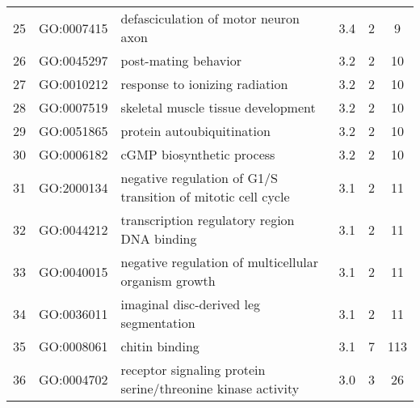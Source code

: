 \begin{tabular}{c|c|p{3in}|c|c|c}
25	&GO:0007415	&defasciculation of motor neuron axon	&3.4	&2	&9\\
26	&GO:0045297	&post-mating behavior	&3.2	&2	&10\\
27	&GO:0010212	&response to ionizing radiation	&3.2	&2	&10\\
28	&GO:0007519	&skeletal muscle tissue development	&3.2	&2	&10\\
29	&GO:0051865	&protein autoubiquitination	&3.2	&2	&10\\
30	&GO:0006182	&cGMP biosynthetic process	&3.2	&2	&10\\
31	&GO:2000134	&negative regulation of G1/S transition of mitotic cell cycle	&3.1	&2	&11\\
32	&GO:0044212	&transcription regulatory region DNA binding	&3.1	&2	&11\\
33	&GO:0040015	&negative regulation of multicellular organism growth	&3.1	&2	&11\\
34	&GO:0036011	&imaginal disc-derived leg segmentation	&3.1	&2	&11\\
35	&GO:0008061	&chitin binding	&3.1	&7	&113\\
36	&GO:0004702	&receptor signaling protein serine/threonine kinase activity	&3.0	&3	&26\\
\end{tabular}
